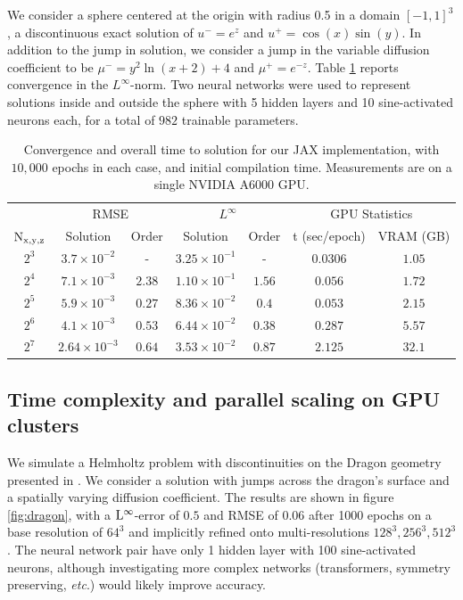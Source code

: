 \documentclass{article}
\begin{document}
We consider a sphere centered at the origin with radius 0.5 in a domain $[-1, 1]^3$, a discontinuous exact solution of $u^-=e^{z}$ and $u^+=\cos(x)\sin(y)$. In addition to the jump in solution, we consider a jump in the variable diffusion coefficient to be $\mu^-=y^2 \ln(x+2) + 4$ and $\mu^+=e^{-z}$. Table \ref{tab:convergence} reports convergence in the $L^\infty$-norm. Two neural networks were used to represent solutions inside and outside the sphere with 5 hidden layers and 10 sine-activated neurons each, for a total of $982$ trainable parameters.


\begin{table}[ht]
\begin{center}
\caption{Convergence and overall time to solution for our JAX implementation, with $10,000$ epochs in each case, and initial compilation time. Measurements are on a single NVIDIA A6000 GPU. } \label{tab:convergence}

\begin{tabular}{ccccccc}
\toprule
 & \multicolumn{2}{c}{RMSE}& \multicolumn{2}{c}{$L^\infty$} & \multicolumn{2}{c}{GPU Statistics} \\
\cmidrule(r){2-3}\cmidrule(r){4-5}\cmidrule(r){6-7}
$\rm N_{x,y,z}$   &   Solution    &   Order   &   Solution   &   Order & t (sec/epoch) & VRAM (GB)\\
\midrule
$2^3$ & $3.7\times 10^{-2}$ &  -        & $3.25\times 10^{-1}$  &   -     & $0.0306$ & $1.05$ \\
$2^4$ & $7.1\times 10^{-3}$ &  $2.38$   & $1.10\times 10^{-1}$   & $1.56$  & $0.056$  & $1.72$ \\ 
$2^5$ & $5.9\times 10^{-3}$ &  $0.27$   & $8.36 \times 10^{-2}$ & $0.4$   & $0.053$  & $2.15$ \\ 
$2^6$ & $4.1\times 10^{-3}$ &  $0.53$   & $6.44\times 10^{-2}$  & $0.38$  & $0.287$  & $5.57$ \\ 
$2^7$ & $2.64\times 10^{-3}$&  $0.64$   & $3.53\times 10^{-2}$  & $0.87$  & $2.125$ & $32.1$ \\ \bottomrule
\end{tabular}
\end{center}
\end{table}

\subsection{Time complexity and parallel scaling on GPU clusters}\label{sec:scaling}

We simulate a Helmholtz problem with discontinuities on the Dragon geometry presented in \cite{curless1996volumetric}. We consider a solution with jumps across the dragon's surface and a spatially varying diffusion coefficient. The results are shown in figure \ref{fig:dragon}, with a $\rm L^\infty$-error of $0.5$ and RMSE of $0.06$ after 1000 epochs on a base resolution of $64^3$ and implicitly refined onto multi-resolutions $128^3,256^3,512^3$. The neural network pair have only 1 hidden layer with 100 sine-activated neurons, although investigating more complex networks (transformers, symmetry preserving, \textit{etc}.) would likely improve accuracy.
\end{document}

